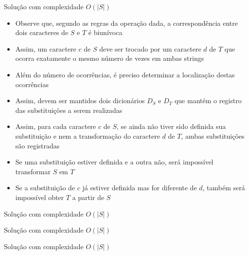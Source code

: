 \begin{frame}[fragile]{Solução com complexidade $O(|S|)$}

    \begin{itemize}
        \item Observe que, segundo as regras da operação dada, a correspondência entre dois
            caracteres de $S$ e $T$ é biunívoca

        \item Assim, um caractere $c$ de $S$ deve ser trocado por um caractere $d$ de $T$ que
            ocorra exatamente o mesmo número de vezes em ambas strings

        \item Além do número de ocorrências, é preciso determinar a localização destas ocorrências

        \item Assim, devem ser mantidos dois dicionários $D_S$ e $D_T$ que mantém o registro
            das substituições a serem realizadas

        \item Assim, para cada caractere $c$ de $S$, se ainda não tiver sido definida sua 
            substituição e nem a transformação do caractere $d$ de $T$, ambas substituições
            são registradas

        \item Se uma substituição estiver definida e a outra não, será impossível transformar
            $S$ em $T$

        \item Se a substituição de $c$ já estiver definida mas for diferente de $d$, também
            será impossível obter $T$ a partir de $S$
    \end{itemize}

\end{frame}

\begin{frame}[fragile]{Solução com complexidade $O(|S|)$}
\end{frame}

\begin{frame}[fragile]{Solução com complexidade $O(|S|)$}
\end{frame}

\begin{frame}[fragile]{Solução com complexidade $O(|S|)$}
\end{frame}
